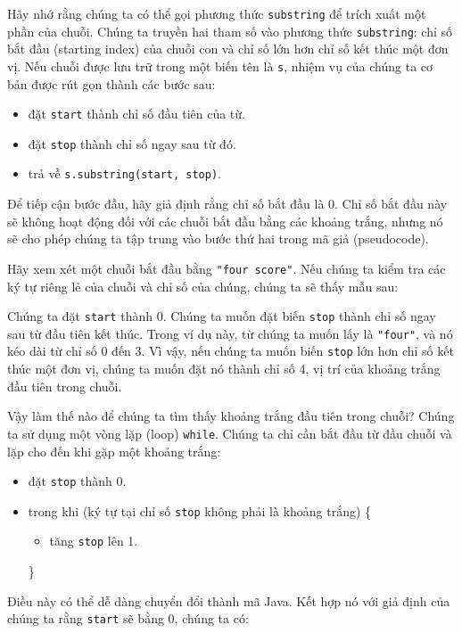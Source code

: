 Hãy nhớ rằng chúng ta có thể gọi phương thức \texttt{substring} để trích xuất một phần của chuỗi. Chúng ta truyền hai tham số vào phương thức \texttt{substring}: chỉ số bắt đầu (starting index) của chuỗi con và chỉ số lớn hơn chỉ số kết thúc một đơn vị. Nếu chuỗi được lưu trữ trong một biến tên là \texttt{s}, nhiệm vụ của chúng ta cơ bản được rút gọn thành các bước sau:
\begin{itemize}
    \item đặt \texttt{start} thành chỉ số đầu tiên của từ.
    \item đặt \texttt{stop} thành chỉ số ngay sau từ đó.
    \item trả về \texttt{s.substring(start, stop)}.
\end{itemize}

Để tiếp cận bước đầu, hãy giả định rằng chỉ số bắt đầu là 0. Chỉ số bắt đầu này sẽ không hoạt động đối với các chuỗi bắt đầu bằng các khoảng trắng, nhưng nó sẽ cho phép chúng ta tập trung vào bước thứ hai trong mã giả (pseudocode).

Hãy xem xét một chuỗi bắt đầu bằng \texttt{"four score"}. Nếu chúng ta kiểm tra các ký tự riêng lẻ của chuỗi và chỉ số của chúng, chúng ta sẽ thấy mẫu sau:

Chúng ta đặt \texttt{start} thành 0. Chúng ta muốn đặt biến \texttt{stop} thành chỉ số ngay sau từ đầu tiên kết thúc. Trong ví dụ này, từ chúng ta muốn lấy là \texttt{"four"}, và nó kéo dài từ chỉ số 0 đến 3. Vì vậy, nếu chúng ta muốn biến \texttt{stop} lớn hơn chỉ số kết thúc một đơn vị, chúng ta muốn đặt nó thành chỉ số 4, vị trí của khoảng trắng đầu tiên trong chuỗi.

Vậy làm thế nào để chúng ta tìm thấy khoảng trắng đầu tiên trong chuỗi? Chúng ta sử dụng một vòng lặp (loop) \texttt{while}. Chúng ta chỉ cần bắt đầu từ đầu chuỗi và lặp cho đến khi gặp một khoảng trắng:
\begin{itemize}
    \item đặt \texttt{stop} thành 0.
    \item trong khi (ký tự tại chỉ số \texttt{stop} không phải là khoảng trắng) \{
    \begin{itemize}
        \item tăng \texttt{stop} lên 1.
    \end{itemize}
    \}
\end{itemize}

Điều này có thể dễ dàng chuyển đổi thành mã Java. Kết hợp nó với giả định của chúng ta rằng \texttt{start} sẽ bằng 0, chúng ta có:

